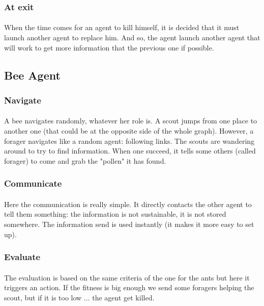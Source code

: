 \documentclass{article}
\begin{document}
		\subsubsection{At exit}
		\paragraph{}
		When the time comes for an agent to kill himself, it is decided that it must launch another agent to replace him.
		And so, the agent launch another agent that will work to get more information that the previous one if possible.
	\subsection{Bee Agent}
		\subsubsection{Navigate}
		\paragraph{}
		A bee navigates randomly, whatever her role is.
		A scout jumps from one place to another one (that could be at the opposite side of the whole graph).
		However, a forager navigates like a random agent: following links.
		The scouts are wandering around to try to find information.
		When one succeed, it tells some others (called forager) to come and grab the "pollen" it has found.
		\subsubsection{Communicate}
		\paragraph{}
		Here the communication is really simple.
		It directly contacts the other agent to tell them something: the information is not sustainable, it is not stored somewhere.
		The information send is used instantly (it makes it more easy to set up).
		\subsubsection{Evaluate}
		\paragraph{}
		The evaluation is based on the same criteria of the one for the ants but here it triggers an action.
		If the fitness is big enough we send some foragers helping the scout, but if it is too low ... the agent get killed.
\end{document}
